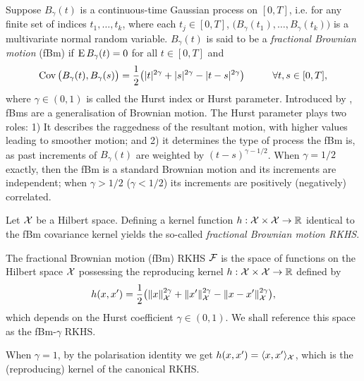 \documentclass[a4paper,showframe,11pt,draft]{report}
\begin{document}
Suppose $B_\gamma(t)$ is a continuous-time Gaussian process on $[0,T]$, i.e. for any finite set of indices $t_1,\dots,t_k$, where each $t_j \in [0,T]$, $\big(B_\gamma(t_1),\dots,B_\gamma(t_k)\big)$ is a multivariate normal random variable.
$B_\gamma(t)$ is said to be a \emph{fractional Brownian motion} (fBm) if $\operatorname{E} B_\gamma(t) = 0$ for all $t \in [0,T]$ and 
\[
  \operatorname{Cov}\big(B_\gamma(t),B_\gamma(s) \big) = \frac{1}{2}\big( |t|^{2\gamma} + |s|^{2\gamma} - |t-s|^{2\gamma} \big) \hspace{1cm} \forall t,s \in [0,T],
\]
where $\gamma \in (0,1)$ is called the Hurst index or Hurst parameter.
Introduced by \citet{mandelbrot1968fractional}, fBms are a generalisation of Brownian motion.
The Hurst parameter plays two roles: 1) It describes the raggedness of the resultant motion, with higher values leading to smoother motion; and 2) it determines the type of process the fBm is, as past increments of $B_\gamma(t)$ are weighted by $(t-s)^{\gamma-1/2}$.
When $\gamma=1/2$ exactly, then the fBm is a standard Brownian motion and its increments are independent; when $\gamma > 1/2$ ($\gamma < 1/2$) its increments are positively (negatively) correlated.


Let ${\mathcal X}$ be a Hilbert space. 
Defining a kernel function $h:{\mathcal X}\times{\mathcal X}\to\mathbb{R}$ identical to the fBm covariance kernel yields the so-called \emph{fractional Brownian motion RKHS}.

\begin{definition}\label{def:fbmrkhs}
  The fractional Brownian motion (fBm) RKHS ${\mathcal F}$ is the space of functions on the Hilbert space ${\mathcal X}$ possessing the reproducing kernel $h:{\mathcal X}\times{\mathcal X}\to\mathbb{R}$ defined by
  \[
    h(x,x') = \frac{1}{2}\big( \lVert x\rVert_{\mathcal X}^{2\gamma} + \lVert x'\rVert_{\mathcal X}^{2\gamma} - \lVert x-x'\rVert_{\mathcal X}^{2\gamma} \big),
  \]
  which depends on the Hurst coefficient $\gamma \in (0,1)$.
  We shall reference this space as the fBm-$\gamma$ RKHS.
\end{definition}

\begin{remark}
  When $\gamma=1$, by the polarisation identity we get $h(x,x') = \langle x,x'\rangle_{\mathcal X}$, which is the (reproducing) kernel of the canonical RKHS.
\end{remark}
\end{document}
